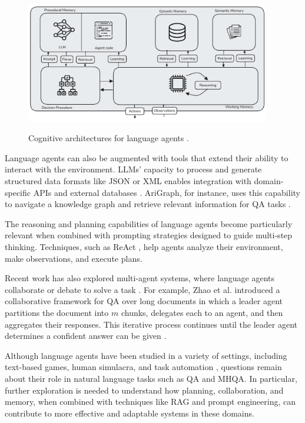 \begin{figure}[h]
    \centering
    \includegraphics[width=0.95\textwidth]{images/cognitive-arch.pdf}\\[-0.25cm]
    \caption{Cognitive architectures for language agents \cite{sumers2024cognitive}.}
    \label{fig:cognitive-arch}
\end{figure}

\noindent Language agents can also be augmented with tools that extend their ability to interact with the environment. LLMs' capacity to process and generate structured data formats like JSON or XML enables integration with domain-specific APIs and external databases \cite{language-agent-tutorial}. AriGraph, for instance, uses this capability to navigate a knowledge graph and retrieve relevant information for QA tasks \cite{anokhin2024arigraphlearningknowledgegraph}.

\noindent The reasoning and planning capabilities of language agents become particularly relevant when combined with prompting strategies designed to guide multi-step thinking. Techniques, such as ReAct \cite{yao2023react}, help agents analyze their environment, make observations, and execute plans.

\noindent Recent work has also explored multi-agent systems, where language agents collaborate or debate to solve a task \cite{language-agent-tutorial}. For example, Zhao et al. introduced a collaborative framework for QA over long documents in which a leader agent partitions the document into $m$ chunks, delegates each to an agent, and then aggregates their responses. This iterative process continues until the leader agent determines a confident answer can be given \cite{zhao-etal-2024-longagent}.

\noindent Although language agents have been studied in a variety of settings, including text-based games, human simulacra, and task automation \cite{10.1145/3586183.3606763}\cite{anokhin2024arigraphlearningknowledgegraph}, questions remain about their role in natural language tasks such as QA and MHQA. In particular, further exploration is needed to understand how planning, collaboration, and memory, when combined with techniques like RAG and prompt engineering, can contribute to more effective and adaptable systems in these domains.


